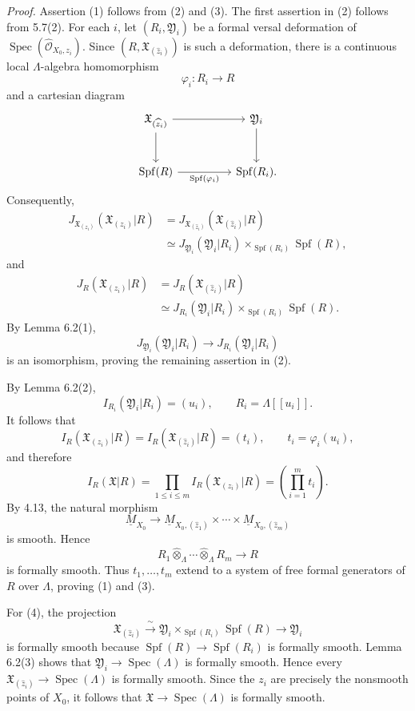\smallskip
\noindent\textit{Proof.}
Assertion (1) follows from (2) and (3). The first assertion in (2)
follows from 5.7(2). For each $i$, let $(R_i,\mathfrak Y_i)$ be a
formal versal deformation of
$\operatorname{Spec}(\widehat{\mathcal O}_{X_0,z_i})$. Since
$(R,\mathfrak X_{(\widehat z_i)})$ is such a deformation, there is a
continuous local $\Lambda$-algebra homomorphism
\[
\varphi_i:R_i\longrightarrow R
\]
and a cartesian diagram
\[
\begin{tikzcd}[column sep=huge,row sep=large]
\mathfrak X_{(\widehat z_i)}
  \arrow[r] \arrow[d]
& \mathfrak Y_i \arrow[d]\\
\operatorname{Spf}(R)
  \arrow[r,"{\operatorname{Spf}(\varphi_i)}"']
& \operatorname{Spf}(R_i).
\end{tikzcd}
\]
Consequently,
\[
\begin{aligned}
J_{\mathfrak X_{(z_i)}}(\mathfrak X_{(z_i)}|R)
&=J_{\mathfrak X_{(\widehat z_i)}}
   (\mathfrak X_{(\widehat z_i)}|R)\\
&\simeq
J_{\mathfrak Y_i}(\mathfrak Y_i|R_i)
 \times_{\operatorname{Spf}(R_i)}\operatorname{Spf}(R),
\end{aligned}
\]
and
\[
\begin{aligned}
J_R(\mathfrak X_{(z_i)}|R)
&=J_R(\mathfrak X_{(\widehat z_i)}|R)\\
&\simeq
J_{R_i}(\mathfrak Y_i|R_i)
 \times_{\operatorname{Spf}(R_i)}\operatorname{Spf}(R).
\end{aligned}
\]
By Lemma 6.2(1),
\[
J_{\mathfrak Y_i}(\mathfrak Y_i|R_i)
 \longrightarrow J_{R_i}(\mathfrak Y_i|R_i)
\]
is an isomorphism, proving the remaining assertion in (2).

By Lemma 6.2(2),
\[
I_{R_i}(\mathfrak Y_i|R_i)=(u_i),
\qquad R_i=\Lambda[[u_i]].
\]
It follows that
\[
I_R(\mathfrak X_{(z_i)}|R)
=I_R(\mathfrak X_{(\widehat z_i)}|R)
=(t_i),
\qquad t_i=\varphi_i(u_i),
\]
and therefore
\[
I_R(\mathfrak X|R)
=\prod_{1\leq i\leq m}I_R(\mathfrak X_{(z_i)}|R)
=\left(\prod_{i=1}^m t_i\right).
\]
By 4.13, the natural morphism
\[
\underline M_{X_0}\longrightarrow
\underline M_{X_0,(\widehat z_1)}\times\cdots\times
\underline M_{X_0,(\widehat z_m)}
\]
is smooth. Hence
\[
R_1\widehat\otimes_\Lambda\cdots
 \widehat\otimes_\Lambda R_m\longrightarrow R
\]
is formally smooth. Thus $t_1,\ldots,t_m$ extend to a system of free
formal generators of $R$ over $\Lambda$, proving (1) and (3).


For (4), the projection
\[
\mathfrak X_{(\widehat z_i)}
 \xrightarrow{\ \sim\ }
\mathfrak Y_i\times_{\operatorname{Spf}(R_i)}
 \operatorname{Spf}(R)
 \longrightarrow\mathfrak Y_i
\]
is formally smooth because
$\operatorname{Spf}(R)\longrightarrow\operatorname{Spf}(R_i)$ is
formally smooth. Lemma 6.2(3) shows that
$\mathfrak Y_i\longrightarrow\operatorname{Spec}(\Lambda)$ is
formally smooth. Hence every
$\mathfrak X_{(\widehat z_i)}\longrightarrow
\operatorname{Spec}(\Lambda)$ is formally smooth. Since the $z_i$
are precisely the nonsmooth points of $X_0$, it follows that
$\mathfrak X\longrightarrow\operatorname{Spec}(\Lambda)$ is formally
smooth.

